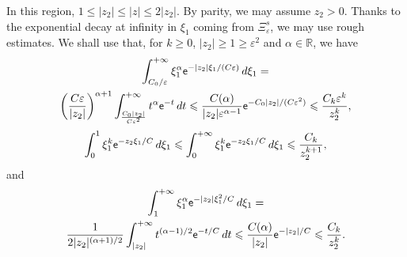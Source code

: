 \documentclass[10pt]{amsart}
\theoremstyle{definition}\newtheorem{defi}[theo]{Definition}\newtheorem{rema}[theo]{Remark}\newtheorem{exam}[theo]{Example}\newtheorem{exem}[theo]{Example}\newtheorem{nota}[theo]{Notation}
\newcommand*\R{\mathbb R}
\newcommand*\ex{{\sf e}}
\newcommand*\ii{\infty}
\newcommand*\gs{\geqslant }
\newcommand*\ls{\leqslant }
\newcommand*\e{\varepsilon}
\begin{document}
In this region, $ 1 \ls |z_2| \ls |z| \ls 2 |z_2 |$. By parity, we may assume $ z_2 > 0 $. Thanks to the exponential decay at infinity in $ \xi_1 $ coming from $ \Xi^s_\e $, we may use rough estimates. We shall use that, for $k \gs 0 $, $ |z_2 | \gs 1 \gs \e^2 $ and $ \alpha \in \R $, we have
\begin{multline}\label{tool2_far}
\int_{C_0 /\e}^{+\ii} \xi_1^\alpha \ex^{- |z_2| \xi_1/ (C \e)} \, d\xi_1 =\\
\left(\frac{C \e}{|z_2|} \right)^{\alpha+1} \int_{ \frac{C_0 |z_2|}{C \e^2}}^{+\ii} t^\alpha \ex^{- t} \, dt
\ls \frac{ C(\alpha)}{|z_2| \e^{\alpha-1}} \ex^{- C_0 |z_2| / (C \e^2)}
\ls \frac{C_k \e^k }{ z_2^k },
\end{multline}
\begin{equation}\label{tool1_far}
\int_0^1 \xi_1^{k} \ex^{- z_2 \xi_1 / C } \, d\xi_1
\ls \int_0^{+\ii} \xi_1^{k} \ex^{- z_2 \xi_1 / C } \, d\xi_1
\ls \frac{C_k}{ z_2^{k+1}},
\end{equation}
and
\begin{multline}\label{tool3_far}
\int_{ 1}^{+\ii} \xi_1^\alpha \ex^{- |z_2| \xi_1^2/ C} \, d\xi_1  =\\
\frac{1}{2 |z_2|^{(\alpha+1)/2} } \int_{ |z_2| }^{+\ii} t^{(\alpha -1)/2 } \ex^{- t / C } \, dt \ls \frac{ C(\alpha)}{|z_2| } \ex^{- |z_2| / C }\ls \frac{C_k }{ z_2^k }.
\end{multline}
\end{document}
